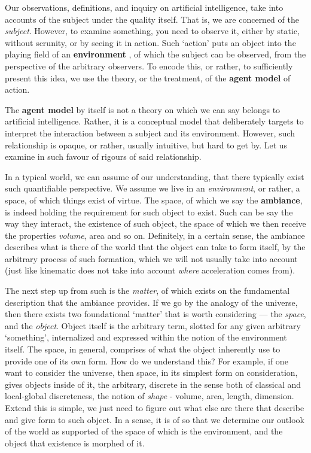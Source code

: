 Our observations, definitions, and inquiry on artificial intelligence, take into accounts of the subject under the quality itself. That is, we are concerned of the \textit{subject}. However, to examine something, you need to observe it, either by static, without scrunity, or by seeing it in action. Such `action' puts an object into the playing field of an \textbf{environment} , of which the subject can be observed, from the perspective of the arbitrary observers. To encode this, or rather, to sufficiently present this idea, we use the theory, or the treatment, of the \textbf{agent model} of action. 

The \textbf{agent model} by itself is not a theory on which we can say belongs to artificial intelligence. Rather, it is a conceptual model that deliberately targets to interpret the interaction between a subject and its environment. However, such relationship is opaque, or rather, usually intuitive, but hard to get by. Let us examine in such favour of rigours of said relationship. 

In a typical world, we can assume of our understanding, that there typically exist such quantifiable perspective. We assume we live in an \textit{environment}, or rather, a space, of which things exist of virtue. The space, of which we say the \textbf{ambiance}, is indeed holding the requirement for such object to exist. Such can be say the way they interact, the existence of such object, the space of which we then receive the properties \textit{volume}, area and so on. Definitely, in a certain sense, the ambiance describes what is there of the world that the object can take to form itself, by the arbitrary process of such formation, which we will not usually take into account (just like kinematic does not take into account \textit{where} acceleration comes from). 

The next step up from such is the \textit{matter}, of which exists on the fundamental description that the ambiance provides. If we go by the analogy of the universe, then there exists two foundational `matter' that is worth considering --- the \textit{space}, and the \textit{object}. Object itself is the arbitrary term, slotted for any given arbitrary `something', internalized and expressed within the notion of the environment itself. The space, in general, comprises of what the object inherently use to provide one of its own form. How do we understand this? For example, if one want to consider the universe, then space, in its simplest form on consideration, gives objects inside of it, the arbitrary, discrete in the sense both of classical and local-global discreteness, the notion of \textit{shape} - volume, area, length, dimension. Extend this is simple, we just need to figure out what else are there that describe and give form to such object. In a sense, it is of so that we determine our outlook of the world as supported of the space of which is the environment, and the object that existence is morphed of it. 

